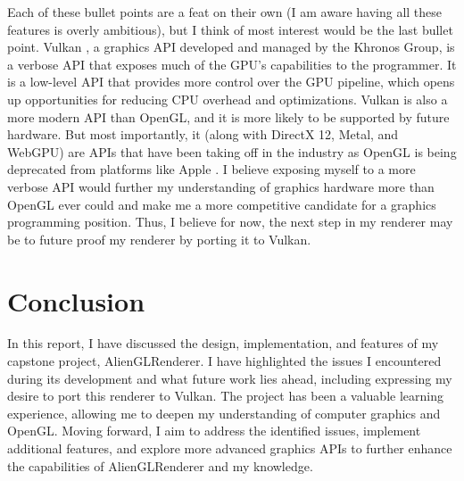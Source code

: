 \documentclass[letterpaper, 10 pt, conference]{ieeeconf}  %
\begin{document}
Each of these bullet points are a feat on their own (I am aware having all these features is overly ambitious), but I think of most interest would be the last bullet point. Vulkan \cite{Vulkan2024}, a graphics API developed and managed by the Khronos Group, is a verbose API that exposes much of the GPU's capabilities to the programmer. It is a low-level API that provides more control over the GPU pipeline, which opens up opportunities for reducing CPU overhead and optimizations. Vulkan is also a more modern API than OpenGL, and it is more likely to be supported by future hardware. But most importantly, it (along with DirectX 12, Metal, and WebGPU) are APIs that have been taking off in the industry as OpenGL is being deprecated from platforms like Apple \cite{Horwitz_2018}. I believe exposing myself to a more verbose API would further my understanding of graphics hardware more than OpenGL ever could and make me a more competitive candidate for a graphics programming position. Thus, I believe for now, the next step in my renderer may be to future proof my renderer by porting it to Vulkan.

\section {Conclusion}
In this report, I have discussed the design, implementation, and features of my capstone project, AlienGLRenderer. I have highlighted the issues I encountered during its development and what future work lies ahead, including expressing my desire to port this renderer to Vulkan. The project has been a valuable learning experience, allowing me to deepen my understanding of computer graphics and OpenGL. Moving forward, I aim to address the identified issues, implement additional features, and explore more advanced graphics APIs to further enhance the capabilities of AlienGLRenderer and my knowledge.
\end{document}

